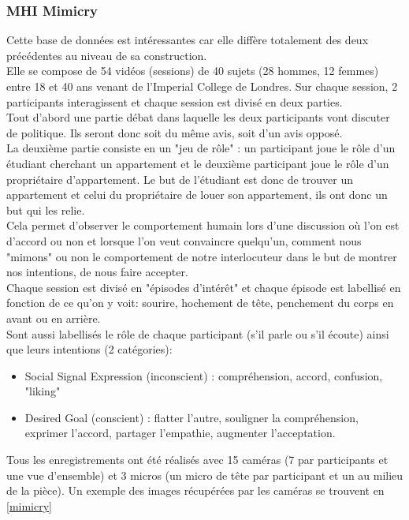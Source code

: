 \documentclass[poster]{polytech/polytech}
\begin{document}
\subsubsection{MHI Mimicry \cite{mimicry1} \cite{mimicry2}}
Cette base de données est intéressantes car elle diffère totalement des deux précédentes au niveau de sa construction.\\
Elle se compose de 54 vidéos (sessions) de 40 sujets (28 hommes, 12 femmes) entre 18 et 40 ans venant de l'Imperial College de Londres. Sur chaque session, 2 participants interagissent et chaque session est divisé en deux parties.\\
Tout d'abord une partie débat dans laquelle les deux participants vont discuter de politique. Ils seront donc soit du même avis, soit d'un avis opposé.\\
La deuxième partie consiste en un "jeu de rôle" : un participant joue le rôle d'un étudiant cherchant un appartement et le deuxième participant joue le rôle d'un propriétaire d'appartement. Le but de l'étudiant est donc de trouver un appartement et celui du propriétaire de louer son appartement, ils ont donc un but qui les relie.\\
Cela permet d'observer le comportement humain lors d'une discussion où l'on est d'accord ou non et lorsque l'on veut convaincre quelqu'un, comment nous "mimons" ou non le comportement de notre interlocuteur dans le but de montrer nos intentions, de nous faire accepter.\\
Chaque session est divisé en "épisodes d’intérêt" et chaque épisode est labellisé en fonction de ce qu'on y voit: sourire, hochement de tête, penchement du corps en avant ou en arrière.\\
Sont aussi labellisés le rôle de chaque participant (s'il parle ou s'il écoute) ainsi que leurs intentions (2 catégories):
\begin{itemize}
\item Social Signal Expression (inconscient) : compréhension, accord, confusion, "liking"
\item Desired Goal (conscient) : flatter l'autre, souligner la compréhension, exprimer l'accord, partager l'empathie, augmenter l'acceptation.\\
\end{itemize}
Tous les enregistrements ont été réalisés avec 15 caméras (7 par participants et une vue d'ensemble) et 3 micros (un micro de tête par participant et un au milieu de la pièce). Un exemple des images récupérées par les caméras se trouvent en \autoref{mimicry}
\end{document}
